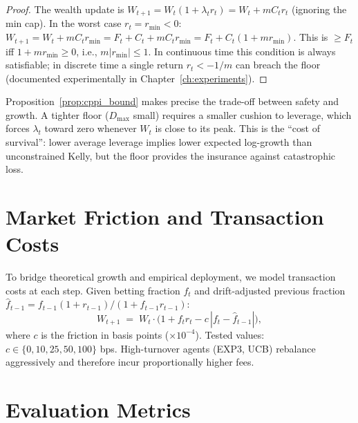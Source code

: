 \begin{proof}
The wealth update is
$W_{t+1} = W_t(1 + \lambda_t r_t) = W_t + m C_t r_t$ (ignoring the min cap).
In the worst case $r_t = r_{\min} < 0$:
$W_{t+1} = W_t + m C_t r_{\min} = F_t + C_t + m C_t r_{\min}
= F_t + C_t(1 + m r_{\min})$.
This is $\geq F_t$ iff $1 + m r_{\min} \geq 0$, i.e., $m|r_{\min}| \leq 1$.
In continuous time this condition is always satisfiable; in discrete time a
single return $r_t < -1/m$ can breach the floor (documented
experimentally in Chapter~\ref{ch:experiments}).
\end{proof}

\begin{remark}
Proposition~\ref{prop:cppi_bound} makes precise the trade-off between safety
and growth.  A tighter floor ($D_{\max}$ small) requires a smaller cushion to
leverage, which forces $\lambda_t$ toward zero whenever $W_t$ is close to its
peak.  This is the ``cost of survival'': lower average leverage implies lower
expected log-growth than unconstrained Kelly, but the floor provides the
insurance against catastrophic loss.
\end{remark}

\section{Market Friction and Transaction Costs}

To bridge theoretical growth and empirical deployment, we model transaction
costs at each step.  Given betting fraction $f_t$ and drift-adjusted previous
fraction $\hat f_{t-1} = f_{t-1}(1+r_{t-1})/(1+f_{t-1}r_{t-1})$:
\begin{equation}
    W_{t+1} \;=\; W_t\cdot\bigl(1 + f_t r_t - c\,|f_t - \hat f_{t-1}|\bigr),
    \label{eq:friction}
\end{equation}
where $c$ is the friction in basis points ($\times 10^{-4}$).  Tested values:
$c\in\{0,10,25,50,100\}$ bps.  High-turnover agents (EXP3, UCB) rebalance
aggressively and therefore incur proportionally higher fees.

\section{Evaluation Metrics}

